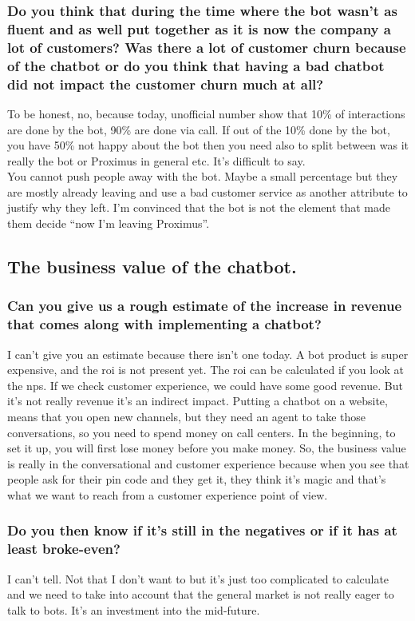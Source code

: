\begin{appendices}
	\subsubsection{Do you think that during the time where the bot wasn’t as fluent and as well put together as it is now the company a lot of customers? Was there a lot of customer churn because of the chatbot or do you think that having a bad chatbot did not impact the customer churn much at all?}
	To be honest, no, because today, unofficial number show that 10\% of interactions are done by the bot, 90\% are done via call. If out of the 10\% done by the bot, you have 50\% not happy about the bot then you need also to split between was it really the bot or Proximus in general etc. It’s difficult to say.\\
	\break
	You cannot push people away with the bot. Maybe a small percentage but they are mostly already leaving and use a bad customer service as another attribute to justify why they left. I’m convinced that the bot is not the element that made them decide “now I’m leaving Proximus”.
	
	\subsection{The business value of the chatbot.}
	\subsubsection{Can you give us a rough estimate of the increase in revenue that comes along with implementing a chatbot?}
	I can’t give you an estimate because there isn’t one today. A bot product is super expensive, and the \acrfull{roi} is not present yet. The \acrshort{roi} can be calculated if you look at the \gls{nps}. If we check customer experience, we could have some good revenue. But it’s not really revenue it’s an indirect impact. Putting a chatbot on a website, means that you open new channels, but they need an agent to take those conversations, so you need to spend money on call centers. In the beginning, to set it up, you will first lose money before you make money. So, the business value is really in the conversational and customer experience because when you see that people ask for their pin code and they get it, they think it’s magic and that’s what we want to reach from a customer experience point of view. 
	
	\subsubsection{Do you then know if it’s still in the negatives or if it has at least broke-even?}
	I can’t tell. Not that I don’t want to but it’s just too complicated to calculate and we need to take into account that the general market is not really eager to talk to bots. It’s an investment into the mid-future.
	

\end{appendices}
